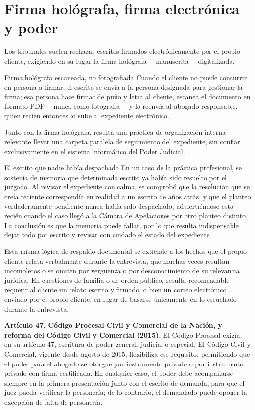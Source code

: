 \documentclass[12pt,oneside]{book}
\begin{document}
\section{Firma hológrafa, firma electrónica y poder}

Los tribunales suelen rechazar escritos firmados electrónicamente por el propio cliente, exigiendo en su lugar la firma hológrafa —manuscrita— digitalizada.

\begin{example}{Firma hológrafa escaneada, no fotografiada}
Cuando el cliente no puede concurrir en persona a firmar, el escrito se envía a la persona designada para gestionar la firma; esa persona hace firmar de puño y letra al cliente, escanea el documento en formato PDF —nunca como fotografía— y lo reenvía al abogado responsable, quien recién entonces lo sube al expediente electrónico.
\end{example}

Junto con la firma hológrafa, resulta una práctica de organización interna relevante llevar una carpeta paralela de seguimiento del expediente, sin confiar exclusivamente en el sistema informático del Poder Judicial.

\begin{example}{El escrito que nadie había despachado}
En un caso de la práctica profesional, se sostenía de memoria que determinado escrito ya había sido resuelto por el juzgado. Al revisar el expediente con calma, se comprobó que la resolución que se creía reciente correspondía en realidad a un escrito de años atrás, y que el planteo verdaderamente pendiente nunca había sido despachado, adviertiéndose esto recién cuando el caso llegó a la Cámara de Apelaciones por otro planteo distinto. La conclusión es que la memoria puede fallar, por lo que resulta indispensable dejar todo por escrito y revisar con cuidado el estado del expediente.
\end{example}

Esta misma lógica de respaldo documental se extiende a los hechos que el propio cliente relata verbalmente durante la entrevista, que muchas veces resultan incompletos o se omiten por vergüenza o por desconocimiento de su relevancia jurídica. En cuestiones de familia o de orden público, resulta recomendable requerir al cliente un relato escrito y firmado, o bien un correo electrónico enviado por el propio cliente, en lugar de basarse únicamente en lo escuchado durante la entrevista.

\begin{important}
\textbf{Artículo 47, Código Procesal Civil y Comercial de la Nación, y reforma del Código Civil y Comercial (2015).} El Código Procesal exigía, en su artículo 47, escritura de poder general, judicial o especial. El Código Civil y Comercial, vigente desde agosto de 2015, flexibiliza ese requisito, permitiendo que el poder para el abogado se otorgue por instrumento privado o por instrumento privado con firma certificada. En cualquier caso, el poder debe acompañarse siempre en la primera presentación junto con el escrito de demanda, para que el juez pueda verificar la personería; de lo contrario, el demandado puede oponer la excepción de falta de personería.
\end{important}
\end{document}
